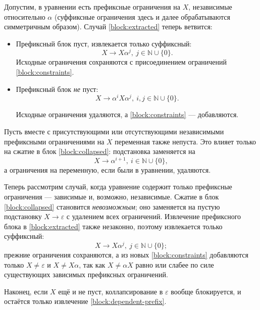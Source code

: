 \documentclass[12pt]{article}
\begin{document}
Допустим, в уравнении есть префиксные ограничения на $X$, независимые
относительно $\alpha$ (суффиксные ограничения здесь и далее обрабатываются
симметричным образом). Случай \eqref{block:extracted} теперь ветвится:
\begin{itemize}
  \item Префиксный блок пуст, извлекается только суффиксный:
  \begin{displaymath}
    X \to X \alpha^j, \ j \in \mathbb{N} \cup \{ 0 \}.
  \end{displaymath}
  Исходные ограничения сохраняются с присоединением ограничений
  \eqref{block:constraints}.
  
  \item Префиксный блок \textit{не} пуст:
  \begin{displaymath}
    X \to \alpha^i X \alpha^j, \ i, j \in \mathbb{N} \cup \{ 0 \}.
  \end{displaymath}

  Исходные ограничения удаляются, а \eqref{block:constraints} ---
  добавляются.
\end{itemize}

Пусть вместе с присутствующими или отсутствующими независимыми префиксными
ограничениями на $X$ переменная также непуста. Это влияет только на сжатие
в блок \eqref{block:collapsed}: подстановка заменяется на
\begin{equation} \label{block:non-empty-collapsed}
  X \to \alpha^{i + 1}, \ i \in \mathbb{N} \cup \{ 0 \},
\end{equation}
а ограничения на переменную, если были в уравнении, удаляются.

Теперь рассмотрим случай, когда уравнение содержит только префиксные
ограничения --- зависимые и, возможно, независимые. Сжатие в блок
\eqref{block:collapsed} становится \textit{невозможным}; оно заменяется на
пустую подстановку $X \to \varepsilon$ с удалением всех ограничений. Извлечение
префиксного блока в \eqref{block:extracted} также незаконно, поэтому
извлекается только суффиксный:
\begin{equation} \label{block:dependent-prefix}
  X \to X \alpha^j, \ j \in \mathbb{N} \cup \{ 0 \};
\end{equation}
прежние ограничения сохраняются, а из новых \eqref{block:constraints}
добавляются только $X \ne \varepsilon$ и $X \ne X \alpha$, так как $X \ne
\alpha X$ равно или слабее по силе существующих зависимых префиксных
ограничений.

Наконец, если $X$ ещё и не пуст, коллапсирование в $\varepsilon$ вообще
блокируется, и остаётся только извлечение \eqref{block:dependent-prefix}.
\end{document}
